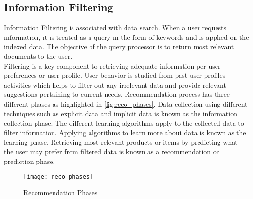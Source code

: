 \subsection{Information Filtering}

Information Filtering is associated with data search. When a user requests information, it is treated as a query in the form of keywords and is applied on the indexed data. The objective of the query processor is to return most relevant documents to the user.
\\
\noindent Filtering is a key component to retrieving adequate information per user preferences or user profile. User behavior is studied from past user profiles activities which helps to filter out any irrelevant data and provide relevant suggestions pertaining to current needs. 
Recommendation process has three different phases as highlighted in \autoref{fig:reco_phases}. Data collection using different techniques such as explicit data and implicit data is known as the information collection phase. The different learning algorithms apply to the collected data to filter information. Applying algorithms to learn more about data is known as the learning phase. 
Retrieving most relevant products or items by predicting what the user may prefer from filtered data is known as a recommendation or prediction phase. 
\\
\begin{figure}[H]
	\centering
	\texttt{[image: reco\_phases]}
	\caption{Recommendation Phases \cite{33}}
	\label{fig:reco_phases}
\end{figure}
